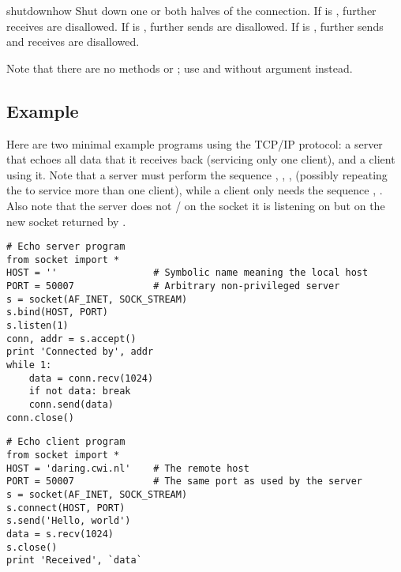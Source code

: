 \begin{funcdesc}{shutdown}{how}
Shut down one or both halves of the connection.  If  is ,
further receives are disallowed.  If  is , further sends are
disallowed.  If  is , further sends and receives are
disallowed.
\end{funcdesc}

Note that there are no methods  or ; use
 and  without  argument instead.

\subsection{Example}

Here are two minimal example programs using the TCP/IP protocol: a
server that echoes all data that it receives back (servicing only one
client), and a client using it.  Note that a server must perform the
sequence , , , 
(possibly repeating the  to service more than one client),
while a client only needs the sequence , .
Also note that the server does not / on the
socket it is listening on but on the new socket returned by
.

\bcode\begin{verbatim}
# Echo server program
from socket import *
HOST = ''                 # Symbolic name meaning the local host
PORT = 50007              # Arbitrary non-privileged server
s = socket(AF_INET, SOCK_STREAM)
s.bind(HOST, PORT)
s.listen(1)
conn, addr = s.accept()
print 'Connected by', addr
while 1:
    data = conn.recv(1024)
    if not data: break
    conn.send(data)
conn.close()
\end{verbatim}\ecode

\bcode\begin{verbatim}
# Echo client program
from socket import *
HOST = 'daring.cwi.nl'    # The remote host
PORT = 50007              # The same port as used by the server
s = socket(AF_INET, SOCK_STREAM)
s.connect(HOST, PORT)
s.send('Hello, world')
data = s.recv(1024)
s.close()
print 'Received', `data`
\end{verbatim}\ecode
